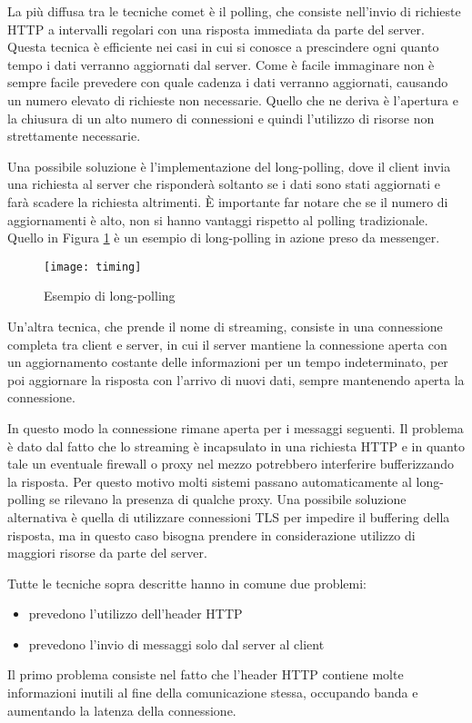 La più diffusa tra le tecniche comet è il polling, che consiste nell'invio di richieste HTTP a intervalli regolari con una risposta immediata da parte del server. 
Questa tecnica è efficiente nei casi in cui si conosce a prescindere ogni quanto tempo i dati verranno aggiornati dal server.
Come è facile immaginare non è sempre facile prevedere con quale cadenza i dati verranno aggiornati, causando un numero elevato di richieste non necessarie.
Quello che ne deriva è l'apertura e la chiusura di un alto numero di connessioni e quindi l'utilizzo di risorse non strettamente necessarie.

Una possibile soluzione è l'implementazione del long-polling, dove il client invia una richiesta al server che risponderà soltanto se i dati sono stati aggiornati e farà scadere la richiesta altrimenti. È importante far notare che se il numero di aggiornamenti è alto, non si hanno vantaggi rispetto al polling tradizionale.
Quello in Figura \ref{fig:timing} è un esempio di long-polling in azione preso da messenger. 

\begin{figure}[htpb!]
  \centering
  \texttt{[image: timing]}
  \caption{Esempio di long-polling}
  \label{fig:timing}
\end{figure}

Un'altra tecnica, che prende il nome di streaming, consiste in una connessione completa tra client e server, in cui il server mantiene la connessione aperta con un aggiornamento costante delle informazioni per un tempo indeterminato, per poi aggiornare la risposta con l'arrivo di nuovi dati, sempre mantenendo aperta la connessione.

In questo modo la connessione rimane aperta per i messaggi seguenti.
Il problema è dato dal fatto che lo streaming è incapsulato in una richiesta HTTP e in quanto tale un eventuale firewall o proxy nel mezzo potrebbero interferire bufferizzando la risposta.
Per questo motivo molti sistemi passano automaticamente al long-polling se rilevano la presenza di qualche proxy.
Una possibile soluzione alternativa è quella di utilizzare connessioni TLS per impedire il buffering della risposta,
ma in questo caso bisogna prendere in considerazione utilizzo di
maggiori risorse da parte del server.

Tutte le tecniche sopra descritte hanno in comune due problemi:
\begin{itemize}
\item prevedono l'utilizzo dell'header HTTP
\item prevedono l'invio di messaggi solo dal server al client
\end{itemize}
Il primo problema consiste nel fatto che l'header HTTP contiene molte informazioni inutili al fine della comunicazione stessa, occupando banda e aumentando la latenza della connessione.

